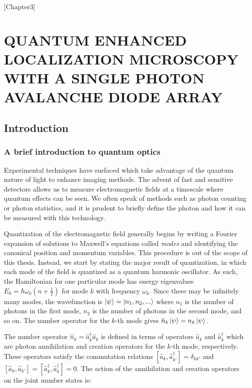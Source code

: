 [Chapter3]
\chapter{QUANTUM ENHANCED LOCALIZATION MICROSCOPY WITH A SINGLE PHOTON AVALANCHE DIODE ARRAY}

\section{Introduction}

\subsection{A brief introduction to quantum optics}

Experimental techniques have surfaced which take advantage of the quantum nature of light to enhance imaging methods. The advent of fast and sensitive detectors allows us to measure electromagnetic fields at a timescale where quantum effects can be seen. We often speak of methods such as photon counting or photon statistics, and it is prudent to briefly define the photon and how it can be measured with this technology.

Quantization of the electromagnetic field generally begins by writing a Fourier expansion of solutions to Maxwell's equations called \emph{modes} and identifying the canonical position and momentum variables. This procedure is out of the scope of this thesis. Instead, we start by stating the major result of quantization, in which each mode of the field is quantized as a quantum harmonic oscillator. As such, the Hamiltonian for one particular mode has energy eigenvalues $E_{k} = \hbar\omega_{k}(n + \frac{1}{2})$ for mode $k$ with frequency $\omega_{k}$. Since there may be infinitely many modes, the wavefunction is $\ket{\psi} = \ket{n_{1},n_{2},...}$ where $n_1$ is the number of photons in the first mode, $n_2$ is the number of photons in the second mode, and so on. The number operator for the $k$-th mode gives $\hat{n}_k\ket{\psi} = n_{k}\ket{\psi}$.

The number operator $\hat{n}_k = \hat{a}_k^\dagger\hat{a}_k$ is defined in terms of operators $\hat{a}_k$ and $\hat{a}_k^\dagger$ which are photon annihilation and creation operators for the $k$-th mode, respectively. These operators satisfy the commutation relations $[\hat{a}_k, \hat{a}_{k'}^\dagger] = \delta_{kk'}$ and $[\hat{a}_k, \hat{a}_{k'}] = [\hat{a}_k^\dagger, \hat{a}_k^\dagger] = 0$. The action of the annihilation and creation operators on the joint number states is:

